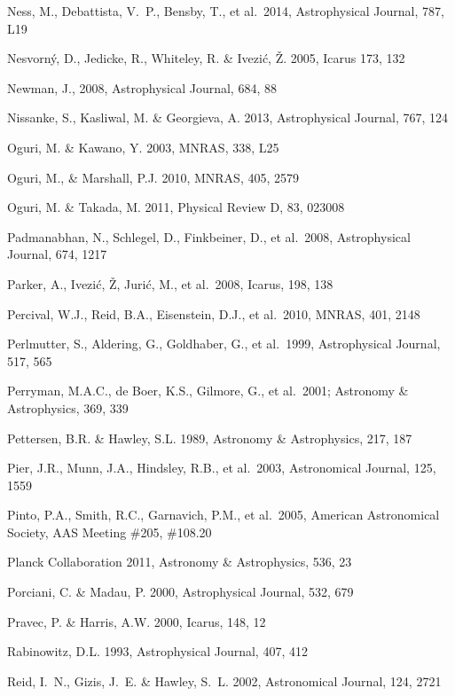 \documentclass{emulateapj}
\begin{document}
\begin{thebibliography}{}
\bibitem[()]{} Ness, M., Debattista, V.~P., Bensby, T., et al.~2014, Astrophysical Journal, 787, L19

\bibitem[()]{} Nesvorn\'{y}, D., Jedicke, R., Whiteley, R. \& Ivezi\'{c}, \v{Z}. 2005, Icarus 173, 132

\bibitem[()]{} Newman, J., 2008, Astrophysical Journal, 684, 88

\bibitem[()]{} Nissanke, S., Kasliwal, M. \& Georgieva, A. 2013,  Astrophysical Journal, 767, 124 

\bibitem[()]{} Oguri, M. \& Kawano, Y. 2003, MNRAS, 338, L25 

\bibitem[()]{} Oguri, M., \& Marshall, P.J. 2010, MNRAS, 405, 2579

\bibitem[()]{} Oguri, M. \& Takada, M. 2011, Physical Review D, 83, 023008

\bibitem[()]{} Padmanabhan, N., Schlegel, D., Finkbeiner, D., et al.~2008, Astrophysical Journal, 674, 1217

\bibitem[()]{} Parker, A., Ivezi\'{c}, \v{Z}, Juri\'{c}, M., et al.~2008, Icarus, 198, 138

\bibitem[()]{} Percival, W.J., Reid, B.A., Eisenstein, D.J., et al.~2010, MNRAS, 401, 2148 

\bibitem[()]{} Perlmutter, S., Aldering, G., Goldhaber, G., et al.~1999, Astrophysical Journal, 517, 565

\bibitem[()]{} Perryman, M.A.C., de Boer, K.S., Gilmore, G., et al.~2001; Astronomy \& 
             Astrophysics, 369, 339

\bibitem[()]{} Pettersen, B.R. \& Hawley, S.L. 1989, Astronomy \& Astrophysics, 217, 187

\bibitem[()]{} Pier, J.R., Munn, J.A., Hindsley, R.B., et al.~2003, Astronomical Journal, 125, 1559

\bibitem[()]{} Pinto, P.A., Smith, R.C., Garnavich, P.M., et al.~2005, 
              American Astronomical Society, AAS Meeting \#205, \#108.20

\bibitem[()]{} Planck Collaboration 2011,  Astronomy \& Astrophysics, 536, 23 

\bibitem[()]{} Porciani, C. \& Madau, P. 2000, Astrophysical Journal, 532, 679

\bibitem[()]{} Pravec, P. \& Harris, A.W. 2000, Icarus, 148, 12

\bibitem[()]{} Rabinowitz, D.L. 1993,  Astrophysical Journal, 407, 412

\bibitem[()]{} Reid, I.~N., Gizis, J.~E. \& Hawley, S.~L. 2002,  Astronomical Journal, 124, 2721 


\end{thebibliography}
\end{document}

